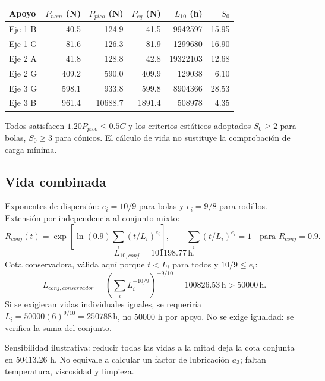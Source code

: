 \documentclass[11pt,a4paper]{article}
\begin{document}
\begin{center}\small\begin{tabular}{lrrrrr}\toprule

Apoyo & $P_{nom}$ (N) & $P_{pico}$ (N) & $P_{eq}$ (N) & $L_{10}$ (h) & $S_0$ \\ \midrule

Eje 1 B & 40.5 & 124.9 & 41.5 & 9942597 & 15.95 \\

Eje 1 G & 81.6 & 126.3 & 81.9 & 1299680 & 16.90 \\

Eje 2 A & 41.8 & 128.8 & 42.8 & 19322103 & 12.68 \\

Eje 2 G & 409.2 & 590.0 & 409.9 & 129038 & 6.10 \\

Eje 3 G & 598.1 & 933.8 & 599.8 & 8904366 & 28.53 \\

Eje 3 B & 961.4 & 10688.7 & 1891.4 & 508978 & 4.35 \\

\bottomrule\end{tabular}\end{center}

Todos satisfacen $1.20P_{pico}\leq0.5C$ y los criterios estáticos adoptados $S_0\geq2$ para bolas, $S_0\geq3$ para cónicos. El cálculo de vida no sustituye la comprobación de carga mínima.

\subsection{Vida combinada}
Exponentes de dispersión: $e_i=10/9$ para bolas y $e_i=9/8$ para rodillos. Extensión por independencia al conjunto mixto:
\[
R_{conj}(t)=\exp\left[\ln(0.9)\sum_i(t/L_i)^{e_i}\right],\qquad
\sum_i(t/L_i)^{e_i}=1\quad\text{para }R_{conj}=0.9.
\]
\[
L_{10,conj}=101198.77\,\mathrm h.
\]
Cota conservadora, válida aquí porque $t<L_i$ para todos y $10/9\leq e_i$:
\[
L_{conj,conservador}=\left(\sum_iL_i^{-10/9}\right)^{-9/10}
=\boxed{100826.53\,\mathrm h>50000\,\mathrm h}.
\]
Si se exigieran vidas individuales iguales, se requeriría $L_i=50000(6)^{9/10}=250788\,\mathrm h$, no 50000 h por apoyo. No se exige igualdad: se verifica la suma del conjunto.

Sensibilidad ilustrativa: reducir todas las vidas a la mitad deja la cota conjunta en 50413.26 h. No equivale a calcular un factor de lubricación $a_3$; faltan temperatura, viscosidad y limpieza.
\end{document}
